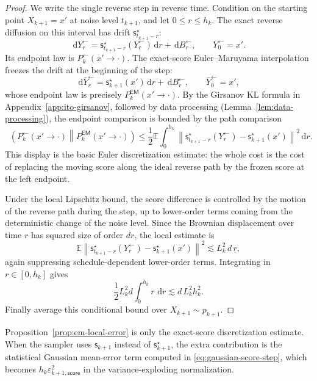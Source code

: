 \documentclass[10pt,a4paper]{amsart}
\numberwithin{equation}{section}
\DeclareMathOperator{\KL}{D_{\mathsf{KL}}}
\newcommand{\E}{\mathbb{E}}
\newcommand{\dd}{\,\mathrm{d}}
\newcommand{\eps}{\varepsilon}
\newcommand{\norm}[1]{\left\lVert #1 \right\rVert}
\newcommand{\sstar}{\mathsf{s}^{\star}}
\newcommand{\score}{\mathsf{s}}
\begin{document}
\begin{proof}
We write the single reverse step in reverse time.  Condition on the starting
point $X_{k+1}=x'$ at noise level $t_{k+1}$, and let
$0\leq r\leq h_k$.  The exact reverse diffusion on this interval has drift
$\sstar_{t_{k+1}-r}$:
\[
    \dd Y^{\leftarrow}_r=\sstar_{t_{k+1}-r}(Y^{\leftarrow}_r)\dd r+\dd B^{\leftarrow}_r,
    \qquad
    Y^{\leftarrow}_0=x'.
\]
Its endpoint law is $P_k^{\leftarrow}(x' \to \cdot)$.  The exact-score
Euler--Maruyama interpolation freezes the drift at the beginning of the step:
\[
    \dd \bar Y^{\leftarrow}_r=\sstar_{k+1}(x')\dd r+\dd B^{\leftarrow}_r,
    \qquad
    \bar Y^{\leftarrow}_0=x',
\]
whose endpoint law is precisely
$P_k^{\mathsf{EM}}(x' \to \cdot)$.  By the Girsanov KL formula in
Appendix~\ref{app:ito-girsanov}, followed by data processing
(Lemma~\ref{lem:data-processing}), the endpoint comparison is bounded by the
path comparison
\[
    \KL\!\left(
        P_k^{\leftarrow}(x' \to \cdot)
        \middle\|
        P_k^{\mathsf{EM}}(x' \to \cdot)
    \right)
    \leq
    \frac12
    \E\int_0^{h_k}
    \norm{
        \sstar_{t_{k+1}-r}(Y^{\leftarrow}_r)-\sstar_{k+1}(x')
    }^2\dd r.
\]
This display is the basic Euler discretization estimate: the whole cost is the
cost of replacing the moving score along the ideal reverse path by the frozen
score at the left endpoint.

Under the local Lipschitz bound, the score difference is controlled by the
motion of the reverse path during the step, up to lower-order terms coming from
the deterministic change of the noise level.  Since the Brownian displacement
over time $r$ has squared size of order $dr$, the local estimate is
\[
    \E\norm{
        \sstar_{t_{k+1}-r}(Y^{\leftarrow}_r)-\sstar_{k+1}(x')
    }^2
    \lesssim
    L_k^2\,d\,r,
\]
again suppressing schedule-dependent lower-order terms.  Integrating in
$r\in[0,h_k]$ gives
\[
    \frac12L_k^2d\int_0^{h_k} r\,\dd r
    \lesssim
    d\,L_k^2h_k^2.
\]
Finally average this conditional bound over $X_{k+1}\sim p_{k+1}$.
\end{proof}

Proposition~\ref{prop:em-local-error} is only the exact-score discretization
estimate.  When the sampler uses $\score_{k+1}$ instead of $\sstar_{k+1}$, the
extra contribution is the statistical Gaussian mean-error term computed in
\eqref{eq:gaussian-score-step}, which becomes
$h_k\eps_{k+1,\mathsf{score}}^2$ in the variance-exploding
normalization.
\end{document}
